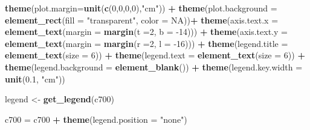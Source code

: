 \documentclass[12pt,twoside]{reedthesis}
\newenvironment{Shaded}{\begin{snugshade}}{\end{snugshade}}
\newcommand{\DataTypeTok}[1]{\textcolor[rgb]{0.13,0.29,0.53}{#1}}
\newcommand{\DecValTok}[1]{\textcolor[rgb]{0.00,0.00,0.81}{#1}}
\newcommand{\FloatTok}[1]{\textcolor[rgb]{0.00,0.00,0.81}{#1}}
\newcommand{\KeywordTok}[1]{\textcolor[rgb]{0.13,0.29,0.53}{\textbf{#1}}}
\newcommand{\NormalTok}[1]{#1}
\newcommand{\OperatorTok}[1]{\textcolor[rgb]{0.81,0.36,0.00}{\textbf{#1}}}
\newcommand{\OtherTok}[1]{\textcolor[rgb]{0.56,0.35,0.01}{#1}}
\newcommand{\StringTok}[1]{\textcolor[rgb]{0.31,0.60,0.02}{#1}}
\begin{document}
\begin{Shaded}
\begin{Highlighting}[]
\StringTok{  }\KeywordTok{theme}\NormalTok{(}\DataTypeTok{plot.margin=}\KeywordTok{unit}\NormalTok{(}\KeywordTok{c}\NormalTok{(}\DecValTok{0}\NormalTok{,}\DecValTok{0}\NormalTok{,}\DecValTok{0}\NormalTok{,}\DecValTok{0}\NormalTok{),}\StringTok{"cm"}\NormalTok{)) }\OperatorTok{+}
\StringTok{  }\KeywordTok{theme}\NormalTok{(}\DataTypeTok{plot.background =} \KeywordTok{element_rect}\NormalTok{(}\DataTypeTok{fill =} \StringTok{"transparent"}\NormalTok{, }\DataTypeTok{color =} \OtherTok{NA}\NormalTok{))}\OperatorTok{+}
\StringTok{  }\KeywordTok{theme}\NormalTok{(}\DataTypeTok{axis.text.x =} \KeywordTok{element_text}\NormalTok{(}\DataTypeTok{margin =}  \KeywordTok{margin}\NormalTok{(}\DataTypeTok{t =}\DecValTok{2}\NormalTok{, }\DataTypeTok{b =} \DecValTok{-14}\NormalTok{))) }\OperatorTok{+}\StringTok{ }
\StringTok{  }\KeywordTok{theme}\NormalTok{(}\DataTypeTok{axis.text.y =} \KeywordTok{element_text}\NormalTok{(}\DataTypeTok{margin =}  \KeywordTok{margin}\NormalTok{(}\DataTypeTok{r =}\DecValTok{2}\NormalTok{, }\DataTypeTok{l =} \DecValTok{-16}\NormalTok{))) }\OperatorTok{+}
\StringTok{  }\KeywordTok{theme}\NormalTok{(}\DataTypeTok{legend.title =} \KeywordTok{element_text}\NormalTok{(}\DataTypeTok{size =} \DecValTok{6}\NormalTok{)) }\OperatorTok{+}
\StringTok{  }\KeywordTok{theme}\NormalTok{(}\DataTypeTok{legend.text =} \KeywordTok{element_text}\NormalTok{(}\DataTypeTok{size =} \DecValTok{6}\NormalTok{)) }\OperatorTok{+}\StringTok{ }
\StringTok{  }\KeywordTok{theme}\NormalTok{(}\DataTypeTok{legend.background =} \KeywordTok{element_blank}\NormalTok{()) }\OperatorTok{+}
\StringTok{  }\KeywordTok{theme}\NormalTok{(}\DataTypeTok{legend.key.width =} \KeywordTok{unit}\NormalTok{(}\FloatTok{0.1}\NormalTok{, }\StringTok{"cm"}\NormalTok{))}

\NormalTok{legend <-}\StringTok{ }\KeywordTok{get_legend}\NormalTok{(c700)}

\NormalTok{c700 =}\StringTok{ }\NormalTok{c700 }\OperatorTok{+}\StringTok{ }\KeywordTok{theme}\NormalTok{(}\DataTypeTok{legend.position =} \StringTok{"none"}\NormalTok{)}


\end{Highlighting}
\end{Shaded}
\end{document}
